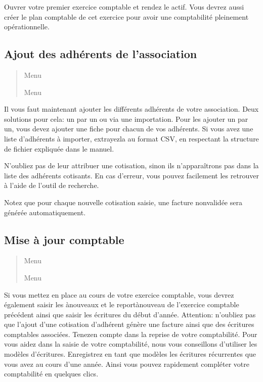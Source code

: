 \documentclass[a4paper,10pt,oneside,french]{sphinxmanual}
\begin{document}
\sphinxAtStartPar
Ouvrer votre premier exercice comptable et rendez le actif.
Vous devrez aussi créer le plan comptable de cet exercice pour avoir une comptabilité pleinement opérationnelle.


\subsection{Ajout des adhérents de l’association}
\label{\detokenize{asso/first_step:ajout-des-adherents-de-l-association}}\begin{quote}

\sphinxAtStartPar
Menu 

\sphinxAtStartPar
Menu 
\end{quote}

\sphinxAtStartPar
Il vous faut maintenant ajouter les différents adhérents de votre association.
Deux solutions pour cela: un par un ou via une importation.
Pour les ajouter un par un, vous devez ajouter une fiche pour chacun de vos adhérents.
Si vous avez une liste d’adhérents à importer, extrayez\sphinxhyphen{}la au format CSV, en respectant la structure de fichier expliquée dans le manuel.

\sphinxAtStartPar
N’oubliez pas de leur attribuer une cotisation, sinon ils n’apparaîtrons pas dans la liste des adhérents cotisants.
En cas d’erreur, vous pouvez facilement les retrouver à l’aide de l’outil de recherche.

\sphinxAtStartPar
Notez que pour chaque nouvelle cotisation saisie, une facture non\sphinxhyphen{}validée sera générée automatiquement.


\subsection{Mise à jour comptable}
\label{\detokenize{asso/first_step:mise-a-jour-comptable}}\begin{quote}

\sphinxAtStartPar
Menu 

\sphinxAtStartPar
Menu 
\end{quote}

\sphinxAtStartPar
Si vous mettez en place  au cours de votre exercice comptable, vous devrez également saisir les à\sphinxhyphen{}nouveaux et le report\sphinxhyphen{}à\sphinxhyphen{}nouveau de l’exercice comptable précédent ainsi que saisir les écritures du début d’année.
Attention: n’oubliez pas que l’ajout d’une cotisation d’adhérent génère une facture ainsi que des écritures comptables associées. Tenez\sphinxhyphen{}en compte dans la reprise de votre comptabilité.
Pour vous aidez dans la saisie de votre comptabilité, nous vous conseillons d’utiliser les modèles d’écritures. Enregistrez en tant que modèles les écritures récurrentes que vous avez au cours d’une année. Ainsi vous pouvez rapidement compléter votre comptabilité en quelques clics.
\end{document}

